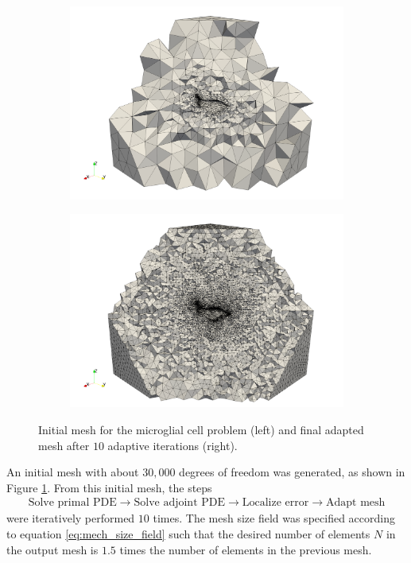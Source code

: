 \begin{figure}[ht!]
\centering
\begin{subfigure}{.5\textwidth}
\centering
\includegraphics[width=.99\linewidth]{img/mech_glial_initial_mesh.png}
\end{subfigure}%
\begin{subfigure}{.5\textwidth}
\centering
\includegraphics[width=.99\linewidth]{img/mech_glial_final_mesh.png}
\end{subfigure}
\caption{Initial mesh for the microglial cell problem (left) and final adapted
mesh after $10$ adaptive iterations (right).}
\label{fig:mech_glial_meshes}
\end{figure}

An initial mesh with about $30,000$ degrees of freedom was generated, as
shown in Figure \ref{fig:mech_glial_meshes}. From this initial mesh, the
steps
%
\begin{gather*}
\text{Solve primal PDE} \rightarrow
\text{Solve adjoint PDE} \rightarrow
\text{Localize error} \rightarrow
\text{Adapt mesh}
\end{gather*}
%
were iteratively performed $10$ times.  The mesh size field was specified
according to equation \eqref{eq:mech_size_field} such that the desired number
of elements $N$ in the output mesh is $1.5$ times the number of elements in
the previous mesh.

